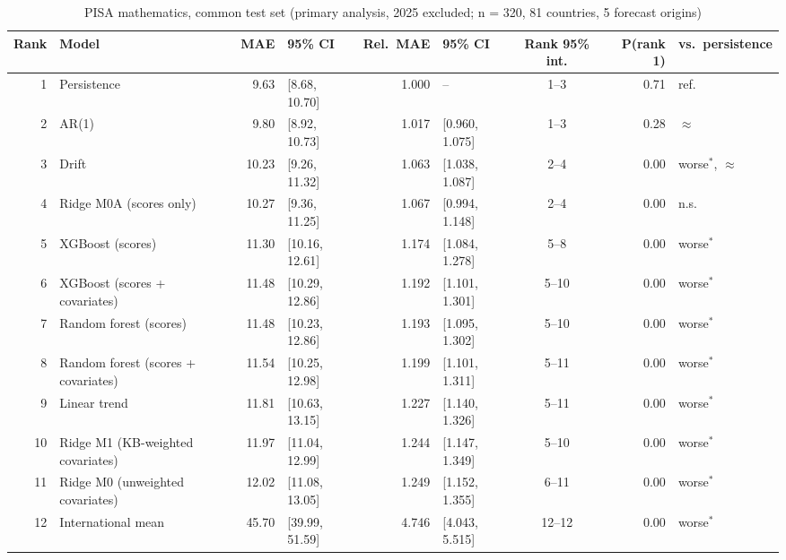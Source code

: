 \begin{table}[htbp]
\centering
\footnotesize
\caption{PISA mathematics, common test set (primary analysis, 2025 excluded; n = 320, 81 countries, 5 forecast origins)}
\label{tab:A2}
\begin{tabular}{rlrlrlcrl}
\toprule
Rank & Model & MAE & 95\% CI & Rel.\ MAE & 95\% CI & Rank 95\% int. & P(rank 1) & vs.\ persistence \\
\midrule
1 & Persistence & 9.63 & [8.68, 10.70] & 1.000 & -- & 1--3 & 0.71 & ref. \\
2 & AR(1) & 9.80 & [8.92, 10.73] & 1.017 & [0.960, 1.075] & 1--3 & 0.28 & $\approx$ \\
3 & Drift & 10.23 & [9.26, 11.32] & 1.063 & [1.038, 1.087] & 2--4 & 0.00 & worse$^{*}$, $\approx$ \\
4 & Ridge M0A (scores only) & 10.27 & [9.36, 11.25] & 1.067 & [0.994, 1.148] & 2--4 & 0.00 & n.s. \\
5 & XGBoost (scores) & 11.30 & [10.16, 12.61] & 1.174 & [1.084, 1.278] & 5--8 & 0.00 & worse$^{*}$ \\
6 & XGBoost (scores + covariates) & 11.48 & [10.29, 12.86] & 1.192 & [1.101, 1.301] & 5--10 & 0.00 & worse$^{*}$ \\
7 & Random forest (scores) & 11.48 & [10.23, 12.86] & 1.193 & [1.095, 1.302] & 5--10 & 0.00 & worse$^{*}$ \\
8 & Random forest (scores + covariates) & 11.54 & [10.25, 12.98] & 1.199 & [1.101, 1.311] & 5--11 & 0.00 & worse$^{*}$ \\
9 & Linear trend & 11.81 & [10.63, 13.15] & 1.227 & [1.140, 1.326] & 5--11 & 0.00 & worse$^{*}$ \\
10 & Ridge M1 (KB-weighted covariates) & 11.97 & [11.04, 12.99] & 1.244 & [1.147, 1.349] & 5--10 & 0.00 & worse$^{*}$ \\
11 & Ridge M0 (unweighted covariates) & 12.02 & [11.08, 13.05] & 1.249 & [1.152, 1.355] & 6--11 & 0.00 & worse$^{*}$ \\
12 & International mean & 45.70 & [39.99, 51.59] & 4.746 & [4.043, 5.515] & 12--12 & 0.00 & worse$^{*}$ \\
\bottomrule
\end{tabular}
\par{}
\end{table}
